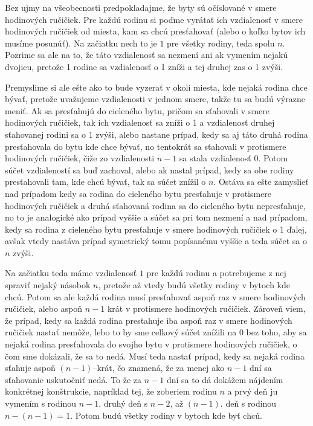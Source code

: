 
Bez ujmy na všeobecnosti predpokladajme, že byty sú očíslované v smere 
hodinových ručičiek. Pre každú rodinu si poďme vyrátať ich vzdialenosť 
v smere hodinových ručičiek od miesta, kam sa chcú presťahovať (alebo 
o koľko bytov ich musíme posunúť). Na začiatku nech to je $1$ pre všetky 
rodiny, teda spolu $n$. Pozrime sa ale na to, že táto vzdialenosť sa 
nezmení ani ak vymením nejakú dvojicu, pretože 1 rodine sa vzdialenosť 
o 1 zníži a tej druhej zas o 1 zvýši. 

Premyslime si ale ešte ako to bude vyzerať v okolí miesta, kde nejaká 
rodina chce bývať, pretože uvažujeme vzdialenosti v jednom smere, takže 
tu sa budú výrazne meniť. Ak sa presťahujú do cieleného bytu, pričom 
sa sťahovali v smere hodinových ručičiek, tak ich vzdialenosť sa zníži 
o 1 a vzdialenosť druhej sťahovanej rodini sa o 1 zvýši, alebo nastane 
prípad, kedy sa aj táto druhá rodina presťahovala do bytu kde chce 
bývať, no tentokrát sa sťahovali v protismere hodinových ručičiek, čiže 
zo vzdialenosti $n-1$ sa stala vzdialenosť $0$. Potom súčet 
vzdialeností sa buď zachoval, alebo ak nastal prípad, kedy sa obe 
rodiny presťahovali tam, kde chcú bývať, tak sa súčet znížil o $n$. 
Ostáva sa ešte zamyslieť nad prípadom kedy sa rodina do cieleného bytu 
presťahuje v protismere hodinových ručičiek a druhá sťahovaná rodina sa 
do cieleného bytu nepresťahuje, no to je analogické ako prípad vyššie 
a súčet sa pri tom nezmení a nad prípadom, kedy sa rodina z cieleného 
bytu presťahuje v smere hodinových ručičiek o 1 ďalej, avšak vtedy 
nastáva prípad symetrický tomu popísanému vyššie a teda súčet sa o $n$ 
zvýši.

Na začiatku teda máme vzdialenosť $1$ pre každú rodinu a potrebujeme 
z nej spraviť nejaký násobok $n$, pretože až vtedy budú všetky rodiny 
v bytoch kde chcú. Potom sa ale každá rodina musí presťahovať aspoň raz 
v smere hodinových ručičiek, alebo aspoň $n-1$ krát v protismere 
hodinových ručičiek. Zároveň viem, že prípad, kedy sa každá rodina 
presťahuje iba aspoň raz v smere hodinových ručičiek nastať nemôže, 
lebo to by sme celkový súčet znížili na $0$ bez toho, aby sa nejaká 
rodina presťahovala do svojho bytu v protismere hodinových ručičiek, 
o čom sme dokázali, že sa to nedá. Musí teda nastať prípad, kedy sa 
nejaká rodina sťahuje aspoň $(n-1)$--krát, čo znamená, že za menej ako 
$n-1$ dní sa sťahovanie uskutočniť nedá. To že za $n-1$ dní sa to dá 
dokážem nájdením konkrétnej konštrukcie, napríklad tej, že zoberiem 
rodinu $n$ a prvý deň ju vymením s rodinou $n-1$, druhý deň s $n-2$, 
až $(n-1)$. deň s rodinou $n-(n-1)=1$. Potom budú všetky rodiny 
v bytoch kde byť chcú.

